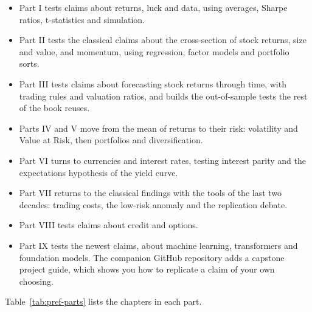 \begin{itemize}
  \item Part I tests claims about returns, luck and data, using averages, Sharpe ratios, t-statistics and simulation.
  \item Part II tests the classical claims about the cross-section of stock returns, size and value, and momentum, using regression, factor models and portfolio sorts.
  \item Part III tests claims about forecasting stock returns through time, with trading rules and valuation ratios, and builds the out-of-sample tests the rest of the book reuses.
  \item Parts IV and V move from the mean of returns to their risk: volatility and Value at Risk, then portfolios and diversification.
  \item Part VI turns to currencies and interest rates, testing interest parity and the expectations hypothesis of the yield curve.
  \item Part VII returns to the classical findings with the tools of the last two decades: trading costs, the low-risk anomaly and the replication debate.
  \item Part VIII tests claims about credit and options.
  \item Part IX tests the newest claims, about machine learning, transformers and foundation models. The companion GitHub repository adds a capstone project guide, which shows you how to replicate a claim of your own choosing.
\end{itemize}

Table~\ref{tab:pref-parts} lists the chapters in each part.


